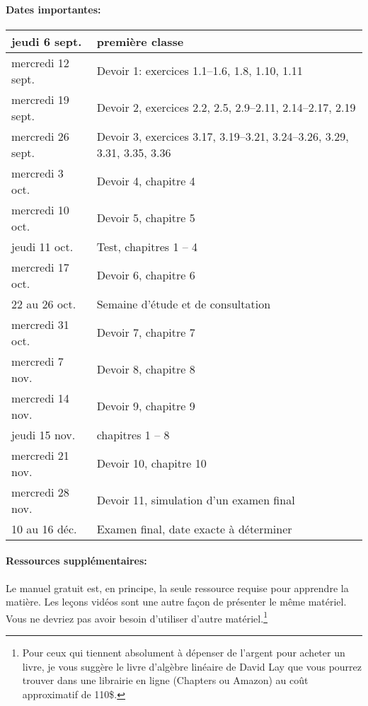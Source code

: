 \documentclass[11pt]{article}
\begin{document}
{\small
\paragraph*{Dates importantes:}
\begin{center}
\begin{tabular}{|l|l|}
\hline \rule{0pt}{0pt}  jeudi 6 sept. & première classe  \\ 
\hline \rule{0pt}{0pt}  mercredi 12 sept. &  Devoir 1: exercices 1.1--1.6, 1.8, 1.10, 1.11\\ 
\hline \rule{0pt}{0pt}  mercredi 19 sept. &  Devoir 2, exercices 2.2, 2.5, 2.9--2.11, 2.14--2.17, 2.19\\ 
\hline \rule{0pt}{0pt}  mercredi 26 sept. &  Devoir 3, exercices 3.17, 3.19--3.21, 3.24--3.26, 3.29, 3.31, 3.35, 3.36\\ 
\hline \rule{0pt}{0pt}  mercredi 3 oct. &  Devoir 4, chapitre 4\\
\hline \rule{0pt}{0pt}  mercredi 10 oct. &  Devoir 5, chapitre 5\\
\hline \rule{0pt}{0pt}  jeudi 11 oct. &  Test, chapitres 1 -- 4 \\ 
\hline \rule{0pt}{0pt}  mercredi 17 oct. &  Devoir 6, chapitre 6\\
\hline \rule{0pt}{0pt} 22 au 26 oct.&  Semaine d'étude et de consultation\\ 
\hline \rule{0pt}{0pt}  mercredi 31 oct. &  Devoir 7, chapitre 7\\ 
\hline \rule{0pt}{0pt}  mercredi 7 nov. &  Devoir 8, chapitre 8\\ 
\hline \rule{0pt}{0pt}  mercredi 14 nov. &  Devoir 9, chapitre 9\\ 
\hline \rule{0pt}{0pt}  jeudi 15 nov. &  chapitres 1 -- 8\\ 
\hline \rule{0pt}{0pt}  mercredi 21 nov. &  Devoir 10, chapitre 10\\ 
\hline \rule{0pt}{0pt}  mercredi 28 nov. &  Devoir 11, simulation d'un examen final  \\ 
\hline \rule{0pt}{0pt} 10 au 16 déc. &  Examen final, date exacte à déterminer\\ 
\hline 
\end{tabular} 
\end{center}
}

\paragraph*{Ressources supplémentaires: } Le manuel gratuit est, en principe, la seule ressource requise pour apprendre la matière.
Les leçons vidéos sont une autre façon de présenter le même matériel. Vous ne devriez pas avoir besoin d'utiliser d'autre matériel.\footnote{
Pour ceux qui tiennent absolument à dépenser de l'argent pour acheter un  livre, je vous suggère le livre d'algèbre linéaire de  David Lay
que vous pourrez trouver dans une librairie en ligne (Chapters ou Amazon) au coût approximatif de 110\$.}
\end{document}

